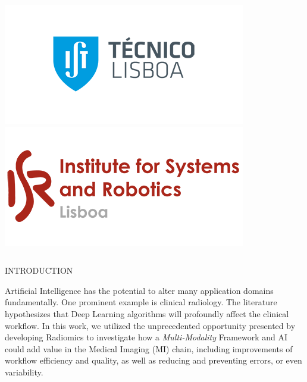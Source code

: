 \documentclass[final]{beamer}
\begin{document}
\begin{frame}[t, fragile = singleslide]{}
\begin{columns}[t]
\begin{column}{0.18\textwidth}
\flushright
\includegraphics[width = 0.8\columnwidth]{./logos/logo003}
\vspace*{\baselineskip}
\includegraphics[width = 0.8\columnwidth]{./logos/logo004}
\end{column}

\begin{column}{0.02\textwidth}
\end{column}

\end{columns}

\begin{columns}[t]

\begin{column}{0.45\textwidth}

\begin{block}{INTRODUCTION}

Artificial Intelligence has the potential to alter many application domains fundamentally. One prominent example is clinical radiology. The literature hypothesizes that Deep Learning algorithms will profoundly affect the clinical workflow. In this work, we utilized the unprecedented opportunity presented by developing Radiomics to investigate how a \textit{Multi-Modality} Framework and AI could add value in the Medical Imaging (MI) chain, including improvements of workflow efficiency and quality, as well as reducing and preventing errors, or even variability.


\end{block}
\end{column}
\end{columns}
\end{frame}
\end{document}
